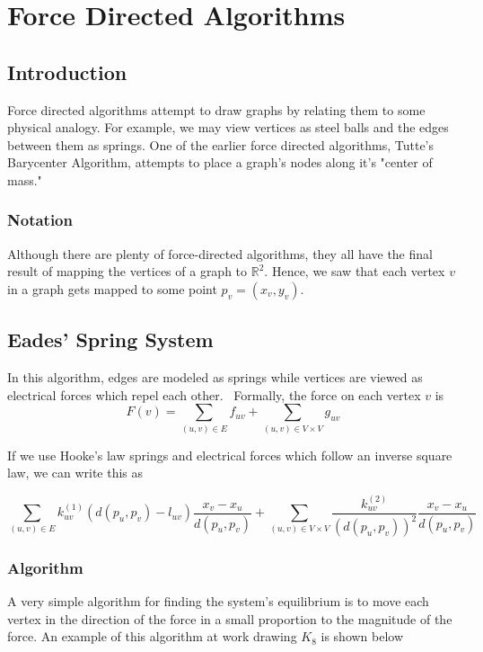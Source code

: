 \documentclass[11pt]{report}
\begin{document}
\pagebreak

\chapter{Force Directed Algorithms}
\section{Introduction}
Force directed algorithms attempt to draw graphs by relating them to some physical analogy. For example, we may view vertices as steel balls and the edges between them as springs. One of the earlier force directed algorithms, Tutte's Barycenter Algorithm, attempts to place a graph's nodes along it's "center of mass."

\subsection{Notation}
Although there are plenty of force-directed algorithms, they all have the final result of mapping the vertices of a graph to $\mathbb{R}^2$. Hence, we saw that each vertex $v$ in a graph gets mapped to some point $p_v = (x_v, y_v)$. 

\section{Eades' Spring System}
In this algorithm, edges are modeled as springs while vertices are viewed as electrical forces which repel each other.~\cite{eades1984heuristic} Formally, the force on each vertex $v$ is 
\[
    F(v) = \sum_{(u, v) \in E} f_{uv} + \sum_{(u, v) \in V \times V} g_{uv}
\]

If we use Hooke's law springs and electrical forces which follow an inverse square law, we can write this as

\[
    \sum_{(u, v) \in E} k_{uv}^{(1)} ( d(p_u, p_v) - l_{uv} ) \frac{x_v - x_u}{d(p_u, p_v)} +
    \sum_{(u, v) \in V \times V} \frac{k_{uv}^{(2)}}{( d(p_u, p_v) )^2 }  \frac{x_v - x_u}{d(p_u, p_v)}
\]

\subsection{Algorithm}
A very simple algorithm for finding the system's equilibrium is to move each vertex in the direction of the force in a small proportion to the magnitude of the force. An example of this algorithm at work drawing $K_8$ is shown below
\end{document}
